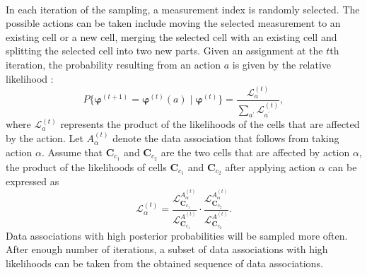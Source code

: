 ~\\
In each iteration of the sampling, a measurement index is randomly selected. The possible actions can be taken include moving the selected measurement to an existing cell or a new cell, merging the selected cell with an existing cell and splitting the selected cell into two new parts. Given an assignment at the $t$th iteration, the probability resulting from an action $a$ is given by the relative likelihood \cite{soextended}:
\begin{equation}
    P\{\boldsymbol{\varphi}^{(t+1)}=\boldsymbol{\varphi}^{(t)}(a)\mid\boldsymbol{\varphi}^{(t)}\} = \frac{\mathcal{L}^{(t)}_a}{\sum_{a^{\prime}}\mathcal{L}^{(t)}_{a^{\prime}}},
    \label{eq:sampling}
\end{equation}
where $\mathcal{L}^{(t)}_a$ represents the product of the likelihoods of the cells that are affected by the action. Let $A_{\alpha}^{(t)}$ denote the data association that follows from taking action $\alpha$. Assume that $\mathbf{C}_{c_1}$ and $\mathbf{C}_{c_2}$ are the two cells that are affected by action $\alpha$, the product of the likelihoods of cells $\mathbf{C}_{c_1}$ and $\mathbf{C}_{c_2}$ after applying action $\alpha$ can be expressed as
\begin{equation}
    \mathcal{L}^{(t)}_{\alpha} = \frac{\mathcal{L}^{A^{(t)}_{\alpha}}_{\mathbf{C}_{c_1}}}{\mathcal{L}^{A^{(t)}}_{\mathbf{C}_{c_1}}}\cdot\frac{\mathcal{L}^{A^{(t)}_{\alpha}}_{\mathbf{C}_{c_2}}}{\mathcal{L}^{A^{(t)}}_{\mathbf{C}_{c_2}}}.
    \label{eq:affectedlikelihood}
\end{equation}
Data associations with high posterior probabilities will be sampled more often. After enough number of iterations, a subset of data associations with high likelihoods can be taken from the obtained sequence of data associations. 